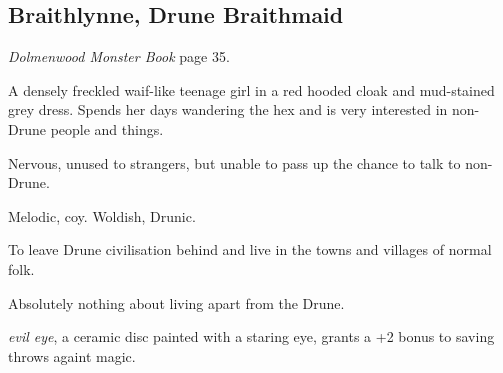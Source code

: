 \documentclass[10pt]{article}
\begin{document}
\begin{multicols*}{2}
\section*{Braithlynne, Drune Braithmaid}

\emph{Dolmenwood Monster Book} page 35.

A densely freckled waif-like teenage girl in a red hooded cloak and
mud-stained grey dress.  Spends her days wandering the hex and is very
interested in non-Drune people and things.

\begin{description}[leftmargin=!,labelwidth=\widthof{\bfseries Demeanour}]
\item[Demeanour] Nervous, unused to strangers, but unable to pass up
  the chance to talk to non-Drune.
\item[Speech] Melodic, coy.  Woldish, Drunic.
\item[Wants] To leave Drune civilisation behind and live in the towns
  and villages of normal folk.
\item[Knows] Absolutely nothing about living apart from the Drune.
\item[Talisman] \emph{evil eye}, a ceramic disc painted with a staring
  eye, grants a +2 bonus to saving throws againt magic.
\end{description}

\end{multicols*}
\end{document}
